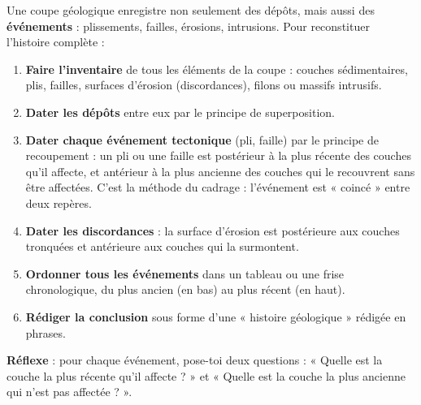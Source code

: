 \documentclass[11pt]{article}
\newcommand{\cle}[1]{{\popxbold\color{popdark}#1}}
\begin{document}
\begin{methode}
Une coupe géologique enregistre non seulement des dépôts, mais aussi des \textbf{événements} : plissements, failles, érosions, intrusions. Pour reconstituer l'histoire complète :
\begin{enumerate}
\item \textbf{Faire l'inventaire} de tous les éléments de la coupe : couches sédimentaires, plis, failles, surfaces d'érosion (discordances), filons ou massifs intrusifs.
\item \textbf{Dater les dépôts} entre eux par le principe de superposition.
\item \textbf{Dater chaque événement tectonique} (pli, faille) par le principe de recoupement : un pli ou une faille est postérieur à la plus récente des couches qu'il affecte, et antérieur à la plus ancienne des couches qui le recouvrent sans être affectées. C'est la méthode du \cle{cadrage} : l'événement est « coincé » entre deux repères.
\item \textbf{Dater les discordances} : la surface d'érosion est postérieure aux couches tronquées et antérieure aux couches qui la surmontent.
\item \textbf{Ordonner tous les événements} dans un tableau ou une frise chronologique, du plus ancien (en bas) au plus récent (en haut).
\item \textbf{Rédiger la conclusion} sous forme d'une « histoire géologique » rédigée en phrases.
\end{enumerate}
\textbf{Réflexe} : pour chaque événement, pose-toi deux questions : « Quelle est la couche la plus récente qu'il affecte ? » et « Quelle est la couche la plus ancienne qui n'est pas affectée ? ».
\end{methode}
\end{document}
